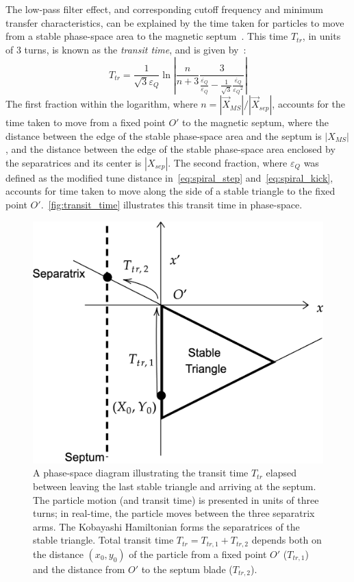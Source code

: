 \documentclass[a4paper,twoside,11pt]{report}
\begin{document}
The low-pass filter effect, and corresponding cutoff frequency and minimum transfer characteristics, can be explained by the time taken for particles to move from a stable phase-space area to the magnetic septum~\cite{Sorge_2018}. This time $T_{tr}$, in units of 3 turns, is known as the \textit{transit time}, and is given by~\cite{Pullia:313678, Bryant:CAS}:
\begin{equation}
  T_{tr} = \frac 1{\sqrt{3}{\varepsilon_Q}} \ln \left| \frac n{n+3} \frac 3{\frac {\dot {\varepsilon_Q}}{\varepsilon_Q} - \frac 1{\sqrt 3}\frac{\dot{{\varepsilon_Q}}}{{{\varepsilon_Q}}^2}}\right|
  \label{eq:transit_time}
\end{equation} 
The first fraction within the logarithm, where $n=|\vec X_{MS}|/|\vec X_{sep}|$, accounts for the time taken to move from a fixed point $O'$ to the magnetic septum, where the distance between the edge of the stable phase-space area and the septum is $|X_{MS}|$, and the distance between the edge of the stable phase-space area enclosed by the separatrices and its center is $|X_{sep}|$. The second fraction, where ${\varepsilon_Q}$ was defined as the modified tune distance in~\autoref{eq:spiral_step} and~\autoref{eq:spiral_kick}, accounts for time taken to move along the side of a stable triangle to the fixed point $O'$.~\autoref{fig:transit_time} illustrates this transit time in phase-space.

\begin{figure}
  \centering
  \includegraphics*[width=0.6\linewidth]{transit-time-phase-space.png}
  \caption[Phase-space diagram of extracted particle transit time]{A phase-space diagram illustrating the transit time $T_{tr}$ elapsed between leaving the last stable triangle and arriving at the septum. The particle motion (and transit time) is presented in units of three turns; in real-time, the particle moves between the three separatrix arms. The Kobayashi Hamiltonian forms the separatrices of the stable triangle. Total transit time $T_{tr}=T_{tr,1} + T_{tr,2}$ depends both on the distance $(x_0, y_0)$ of the particle from a fixed point $O'$ ($T_{tr,1}$) and the distance from $O'$ to the septum blade ($T_{tr,2}$).}\label{fig:transit_time}
\end{figure}
\end{document}
